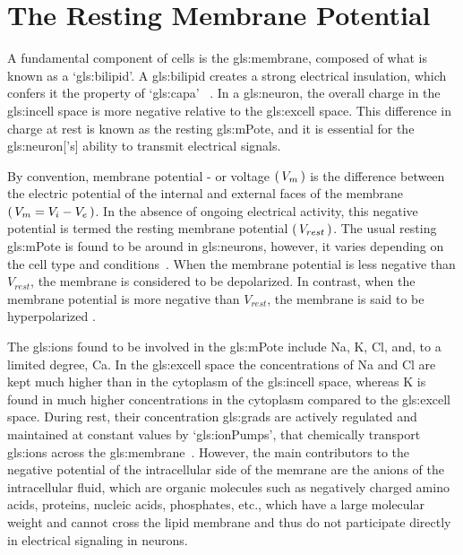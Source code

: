 \documentclass[class={.NoTouch/myProject}, crop=false]{standalone}
\begin{document}
\section{The Resting Membrane Potential} 
A fundamental component of cells is the \gls{gls:membrane}, composed of what is known as a `\gls{gls:bilipid}'\footnotemark. A \gls{gls:bilipid} creates a strong electrical insulation, 
which confers it the property of `\gls{gls:capa}'~\cite{}
.  
In a \gls{gls:neuron}, the overall charge in the \gls{gls:incell} space is more negative relative to the \gls{gls:excell} space. This difference in charge at rest is known as the resting \gls{gls:mPote}, and it is essential for the \gls{gls:neuron}['s] ability to transmit electrical signals. 

By convention, membrane potential - or voltage \(\br{V_m}\) is the difference between the electric potential of the internal and external faces of the membrane \(\br{V_m=V_i-V_e}\). In the absence of ongoing electrical activity, this negative potential is termed the resting membrane potential \(\br{V_{rest}}\).  The usual resting \gls{gls:mPote} is found to be around  in \glspl{gls:neuron}, however, it varies depending on the cell type and conditions~\cite{}. When the membrane potential is less negative than  \(V_{rest}\), the membrane is considered to be depolarized. In contrast, when the membrane potential is more negative than \(V_{rest}\), the membrane is said to be hyperpolarized \cite{Hammond2015ch3}. 

The \glspl{gls:ion} found to be involved in the \gls{gls:mPote} include \gls{Na}, \gls{K}, \gls{Cl}, and, to a limited degree, \gls{Ca}. 
In the \gls{gls:excell} space the concentrations of \gls{Na} and  \gls{Cl} are kept much higher than in the cytoplasm of the \gls{gls:incell} space, whereas \gls{K} is found in much higher concentrations in the cytoplasm compared to the \gls{gls:excell} space. During rest, their concentration \glspl{gls:grad} are actively regulated and maintained at constant values by `\glspl{gls:ionPump}', that chemically transport \glspl{gls:ion} across the \gls{gls:membrane}~\cite{}. However, the main contributors to the negative potential of the intracellular side of the memrane are the anions of the intracellular fluid, which are organic molecules such as negatively charged amino acids, proteins, nucleic acids, phosphates, etc., which have a large molecular weight and cannot cross the lipid membrane and thus do not participate directly in electrical signaling in neurons\cite{Hammond2015ch3}. 
\end{document}

